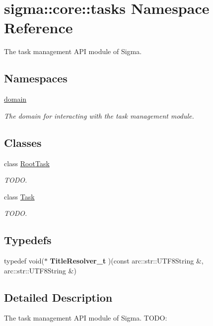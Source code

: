 \hypertarget{namespacesigma_1_1core_1_1tasks}{\section{sigma\-:\-:core\-:\-:tasks Namespace Reference}
\label{namespacesigma_1_1core_1_1tasks}
}


The task management A\-P\-I module of Sigma.  


\subsection*{Namespaces}
\begin{DoxyCompactItemize}
\item 
\hyperlink{namespacesigma_1_1core_1_1tasks_1_1domain}{domain}
\begin{DoxyCompactList}\small\item\em The domain for interacting with the task management module. \end{DoxyCompactList}\end{DoxyCompactItemize}
\subsection*{Classes}
\begin{DoxyCompactItemize}
\item 
class \hyperlink{classsigma_1_1core_1_1tasks_1_1_root_task}{Root\-Task}
\begin{DoxyCompactList}\small\item\em T\-O\-D\-O. \end{DoxyCompactList}\item 
class \hyperlink{classsigma_1_1core_1_1tasks_1_1_task}{Task}
\begin{DoxyCompactList}\small\item\em T\-O\-D\-O. \end{DoxyCompactList}\end{DoxyCompactItemize}
\subsection*{Typedefs}
\begin{DoxyCompactItemize}
\item 
\hypertarget{namespacesigma_1_1core_1_1tasks_a39960f0c083a360cafd859f4f394ff8e}{typedef void($\ast$ {\bfseries Title\-Resolver\-\_\-t} )(const arc\-::str\-::\-U\-T\-F8\-String \&, arc\-::str\-::\-U\-T\-F8\-String \&)}\label{namespacesigma_1_1core_1_1tasks_a39960f0c083a360cafd859f4f394ff8e}

\end{DoxyCompactItemize}


\subsection{Detailed Description}
The task management A\-P\-I module of Sigma. T\-O\-D\-O\-: 